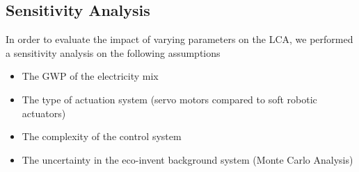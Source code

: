 \subsection{Sensitivity Analysis}

In order to evaluate the impact of varying parameters on the LCA, we performed a sensitivity analysis on the following assumptions
\begin{itemize}
\item The GWP of the electricity mix
\item The type of actuation system (servo motors compared to soft robotic actuators)
\item The complexity of the control system
\item The uncertainty in the eco-invent background system (Monte Carlo Analysis)
\end{itemize}


